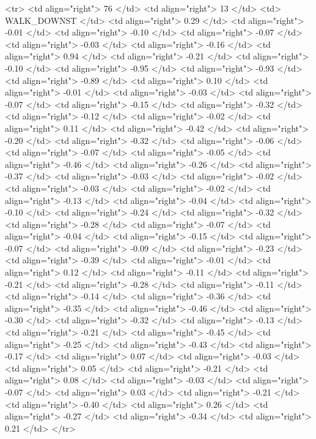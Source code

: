   <tr> <td align="right"> 76 </td> <td align="right">  13 </td> <td> WALK_DOWNST </td> <td align="right"> 0.29 </td> <td align="right"> -0.01 </td> <td align="right"> -0.10 </td> <td align="right"> -0.07 </td> <td align="right"> -0.03 </td> <td align="right"> -0.16 </td> <td align="right"> 0.94 </td> <td align="right"> -0.21 </td> <td align="right"> -0.10 </td> <td align="right"> -0.95 </td> <td align="right"> -0.93 </td> <td align="right"> -0.89 </td> <td align="right"> 0.10 </td> <td align="right"> -0.01 </td> <td align="right"> -0.03 </td> <td align="right"> -0.07 </td> <td align="right"> -0.15 </td> <td align="right"> -0.32 </td> <td align="right"> -0.12 </td> <td align="right"> -0.02 </td> <td align="right"> 0.11 </td> <td align="right"> -0.42 </td> <td align="right"> -0.20 </td> <td align="right"> -0.32 </td> <td align="right"> -0.06 </td> <td align="right"> -0.07 </td> <td align="right"> -0.05 </td> <td align="right"> -0.46 </td> <td align="right"> -0.26 </td> <td align="right"> -0.37 </td> <td align="right"> -0.03 </td> <td align="right"> -0.02 </td> <td align="right"> -0.03 </td> <td align="right"> -0.02 </td> <td align="right"> -0.13 </td> <td align="right"> -0.04 </td> <td align="right"> -0.10 </td> <td align="right"> -0.24 </td> <td align="right"> -0.32 </td> <td align="right"> -0.28 </td> <td align="right"> -0.07 </td> <td align="right"> -0.04 </td> <td align="right"> -0.15 </td> <td align="right"> -0.07 </td> <td align="right"> -0.09 </td> <td align="right"> -0.23 </td> <td align="right"> -0.39 </td> <td align="right"> -0.01 </td> <td align="right"> 0.12 </td> <td align="right"> -0.11 </td> <td align="right"> -0.21 </td> <td align="right"> -0.28 </td> <td align="right"> -0.11 </td> <td align="right"> -0.14 </td> <td align="right"> -0.36 </td> <td align="right"> -0.35 </td> <td align="right"> -0.46 </td> <td align="right"> -0.30 </td> <td align="right"> -0.32 </td> <td align="right"> -0.13 </td> <td align="right"> -0.21 </td> <td align="right"> -0.45 </td> <td align="right"> -0.25 </td> <td align="right"> -0.43 </td> <td align="right"> -0.17 </td> <td align="right"> 0.07 </td> <td align="right"> -0.03 </td> <td align="right"> 0.05 </td> <td align="right"> -0.21 </td> <td align="right"> 0.08 </td> <td align="right"> -0.03 </td> <td align="right"> -0.07 </td> <td align="right"> 0.03 </td> <td align="right"> -0.21 </td> <td align="right"> -0.40 </td> <td align="right"> 0.26 </td> <td align="right"> -0.27 </td> <td align="right"> -0.34 </td> <td align="right"> 0.21 </td> </tr>

